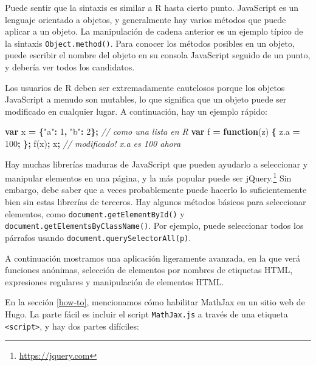 \documentclass[12pt,]{krantz}
\makeatletter
\newenvironment{Shaded}{\begin{snugshade}}{\end{snugshade}}
\newcommand{\AttributeTok}[1]{\textcolor[rgb]{0.77,0.63,0.00}{#1}}
\newcommand{\CommentTok}[1]{\textcolor[rgb]{0.56,0.35,0.01}{\textit{#1}}}
\newcommand{\DecValTok}[1]{\textcolor[rgb]{0.00,0.00,0.81}{#1}}
\newcommand{\KeywordTok}[1]{\textcolor[rgb]{0.13,0.29,0.53}{\textbf{#1}}}
\newcommand{\NormalTok}[1]{#1}
\newcommand{\OperatorTok}[1]{\textcolor[rgb]{0.81,0.36,0.00}{\textbf{#1}}}
\newcommand{\StringTok}[1]{\textcolor[rgb]{0.31,0.60,0.02}{#1}}
\newcommand{\VariableTok}[1]{\textcolor[rgb]{0.00,0.00,0.00}{#1}}
\renewcommand{\href}[2]{#2\footnote{\url{#1}}}
\newenvironment{kframe}{%
\medskip{}
\setlength{\fboxsep}{.8em}
 \def\at@end@of@kframe{}%
 \ifinner\ifhmode%
  \def\at@end@of@kframe{\end{minipage}}%
  \begin{minipage}{\columnwidth}%
 \fi\fi%
 \def\FrameCommand##1{\hskip\@totalleftmargin \hskip-\fboxsep
 \colorbox{shadecolor}{##1}\hskip-\fboxsep
     \hskip-\linewidth \hskip-\@totalleftmargin \hskip\columnwidth}%
 \MakeFramed {\advance\hsize-\width
   \@totalleftmargin\z@ \linewidth\hsize
   \@setminipage}}%
 {\par\unskip\endMakeFramed%
 \at@end@of@kframe}
\renewenvironment{Shaded}{\begin{kframe}}{\end{kframe}}
\theoremstyle{definition}
\theoremstyle{definition}
\theoremstyle{definition}
\theoremstyle{remark}
\makeatother
\begin{document}
Puede sentir que la sintaxis es similar a R hasta cierto punto.
JavaScript es un lenguaje orientado a objetos, y generalmente hay varios
métodos que puede aplicar a un objeto. La manipulación de cadena
anterior es un ejemplo típico de la sintaxis \texttt{Object.method()}.
Para conocer los métodos posibles en un objeto, puede escribir el nombre
del objeto en su consola JavaScript seguido de un punto, y debería ver
todos los candidatos.

Los usuarios de R deben ser extremadamente cautelosos porque los objetos
JavaScript a menudo son mutables, lo que significa que un objeto puede
ser modificado en cualquier lugar. A continuación, hay un ejemplo
rápido:

\begin{Shaded}
\begin{Highlighting}[]
\KeywordTok{var}\NormalTok{ x }\OperatorTok{=} \OperatorTok{\{}\StringTok{"a"}\OperatorTok{:} \DecValTok{1}\OperatorTok{,} \StringTok{"b"}\OperatorTok{:} \DecValTok{2}\OperatorTok{\};}  \CommentTok{// como una lista en R}
\KeywordTok{var}\NormalTok{ f }\OperatorTok{=} \KeywordTok{function}\NormalTok{(z) }\OperatorTok{\{}
  \VariableTok{z}\NormalTok{.}\AttributeTok{a} \OperatorTok{=} \DecValTok{100}\OperatorTok{;}
\OperatorTok{\};}
\AttributeTok{f}\NormalTok{(x)}\OperatorTok{;}
\NormalTok{x}\OperatorTok{;}  \CommentTok{// modificado! x.a es 100 ahora}
\end{Highlighting}
\end{Shaded}

Hay muchas librerías maduras de JavaScript que pueden ayudarlo a
seleccionar y manipular elementos en una página, y la más popular puede
ser \href{https://jquery.com}{jQuery.} Sin embargo, debe
saber que a veces probablemente puede hacerlo lo suficientemente bien
sin estas librerías de terceros. Hay algunos métodos básicos para
seleccionar elementos, como \texttt{document.getElementById()} y
\texttt{document.getElementsByClassName()}. Por ejemplo, puede
seleccionar todos los párrafos usando
\texttt{document.querySelectorAll(\textquotesingle{}p\textquotesingle{})}.

A continuación mostramos una aplicación ligeramente avanzada, en la que
verá funciones anónimas, selección de elementos por nombres de etiquetas
HTML, expresiones regulares y manipulación de elementos HTML.

En la sección \ref{how-to}, mencionamos cómo habilitar
MathJax en un sitio web de Hugo. La parte fácil es
incluir el script \texttt{MathJax.js} a través de una etiqueta
\texttt{\textless{}script\textgreater{}}, y hay dos partes difíciles:
\end{document}
